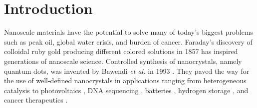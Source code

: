 \section{Introduction}

Nanoscale materials have the potential to solve many of today's biggest problems such as peak oil, global water crisis, and burden of cancer.
Faraday's discovery of colloidal ruby gold producing different colored solutions in 1857 \cite{Faraday_1857,Thompson_2007} has inspired generations of nanoscale science.
Controlled synthesis of nanocrystals, namely quantum dots, was invented by Bawendi \textit{et al.} in 1993 \cite{hakimi1993quantum,Murray_2000}.
They paved the way for the use of well-defined nanocrystals in applications ranging from heterogeneous catalysis \cite{astruc2008nanoparticles,Astruc_2006} to photovoltaics \cite{Atwater_2010}, DNA sequencing \cite{McNally_2010}, batteries \cite{Panniello_2014}, hydrogen storage \cite{Jena_2011,Ramos_Castillo_2015}, and cancer therapeutics \cite{Jain_2010,Kim_2010}.

  
  
  